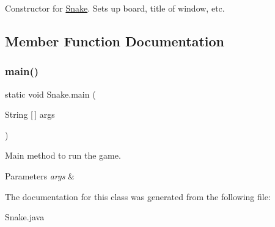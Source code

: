 Constructor for \hyperlink{class_snake}{Snake}. Sets up board, title of window, etc. 

\subsection{Member Function Documentation}
\mbox{\label{class_snake_a44187b37496c7c746cf12abdbf85c8cd}} 
\subsubsection{\texorpdfstring{main()}{main()}}
{\footnotesize\ttfamily static void Snake.\+main (\begin{DoxyParamCaption}\item[{String \mbox{[}$\,$\mbox{]}}]{args }\end{DoxyParamCaption})\hspace{0.3cm}{\ttfamily [static]}}

Main method to run the game. 
\begin{DoxyParams}{Parameters}
{\em args} & \\
\hline
\end{DoxyParams}


The documentation for this class was generated from the following file\+:\begin{DoxyCompactItemize}
\item 
Snake.\+java\end{DoxyCompactItemize}
